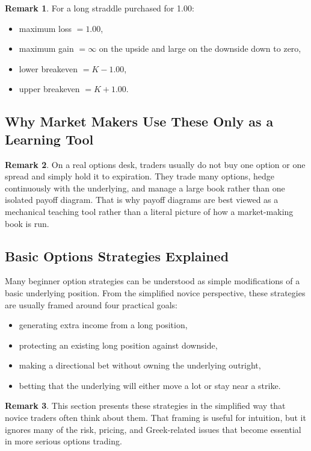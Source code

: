 \documentclass[11pt]{article}
\theoremstyle{definition}
\newtheorem{remark}{Remark}[section]
\begin{document}
\begin{remark}
For a long straddle purchased for 1.00:
\begin{itemize}[leftmargin=2em]
    \item maximum loss \(= 1.00\),
    \item maximum gain \(= \infty\) on the upside and large on the downside down to zero,
    \item lower breakeven \(= K - 1.00\),
    \item upper breakeven \(= K + 1.00\).
\end{itemize}
\end{remark}

\subsection{Why Market Makers Use These Only as a Learning Tool}

\begin{remark}
On a real options desk, traders usually do not buy one option or one spread and simply hold it to expiration. They trade many options, hedge continuously with the underlying, and manage a large book rather than one isolated payoff diagram. That is why payoff diagrams are best viewed as a mechanical teaching tool rather than a literal picture of how a market-making book is run. 
\end{remark}

\subsection{Basic Options Strategies Explained}

Many beginner option strategies can be understood as simple modifications of a basic underlying position. From the simplified novice perspective, these strategies are usually framed around four practical goals:
\begin{itemize}[leftmargin=2em]
    \item generating extra income from a long position,
    \item protecting an existing long position against downside,
    \item making a directional bet without owning the underlying outright,
    \item betting that the underlying will either move a lot or stay near a strike.
\end{itemize}

\begin{remark}
This section presents these strategies in the simplified way that novice traders often think about them. That framing is useful for intuition, but it ignores many of the risk, pricing, and Greek-related issues that become essential in more serious options trading.
\end{remark}
\end{document}
